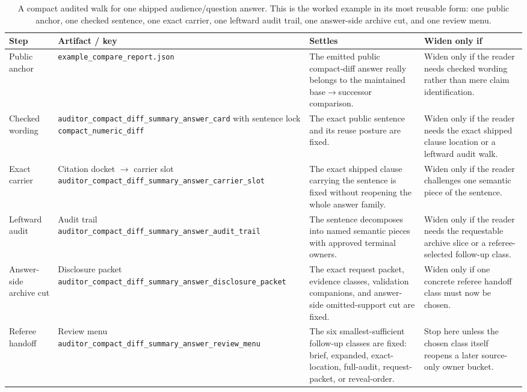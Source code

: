 \documentclass[11pt]{article}
\begin{document}
\begin{table}[t]
\centering
\small
\begin{tabularx}{\linewidth}{@{}Y Y Y Y@{}}
\toprule
Step & Artifact / key & Settles & Widen only if \\
\midrule
Public anchor & \texttt{example\_compare\_report.json} & The emitted public compact-diff answer really belongs to the maintained base$\to$successor comparison. & Widen only if the reader needs checked wording rather than mere claim identification. \\
Checked wording & \texttt{auditor\_compact\_diff\_summary\_answer\_card} with sentence lock \texttt{compact\_numeric\_diff} & The exact public sentence and its reuse posture are fixed. & Widen only if the reader needs the exact shipped clause location or a leftward audit walk. \\
Exact carrier & Citation docket $\to$ carrier slot \texttt{auditor\_compact\_diff\_summary\_answer\_carrier\_slot} & The exact shipped clause carrying the sentence is fixed without reopening the whole answer family. & Widen only if the reader challenges one semantic piece of the sentence. \\
Leftward audit & Audit trail \texttt{auditor\_compact\_diff\_summary\_answer\_audit\_trail} & The sentence decomposes into named semantic pieces with approved terminal owners. & Widen only if the reader needs the requestable archive slice or a referee-selected follow-up class. \\
Answer-side archive cut & Disclosure packet \texttt{auditor\_compact\_diff\_summary\_answer\_disclosure\_packet} & The exact request packet, evidence classes, validation companions, and answer-side omitted-support cut are fixed. & Widen only if one concrete referee handoff class must now be chosen. \\
Referee handoff & Review menu \texttt{auditor\_compact\_diff\_summary\_answer\_review\_menu} & The six smallest-sufficient follow-up classes are fixed: brief, expanded, exact-location, full-audit, request-packet, or reveal-order. & Stop here unless the chosen class itself reopens a later source-only owner bucket. \\
\bottomrule
\end{tabularx}
\caption{A compact audited walk for one shipped audience/question answer. This is the worked example in its most reusable form: one public anchor, one checked sentence, one exact carrier, one leftward audit trail, one answer-side archive cut, and one review menu.}
\label{tab:workedexample-concrete-drill}
\end{table}
\end{document}
